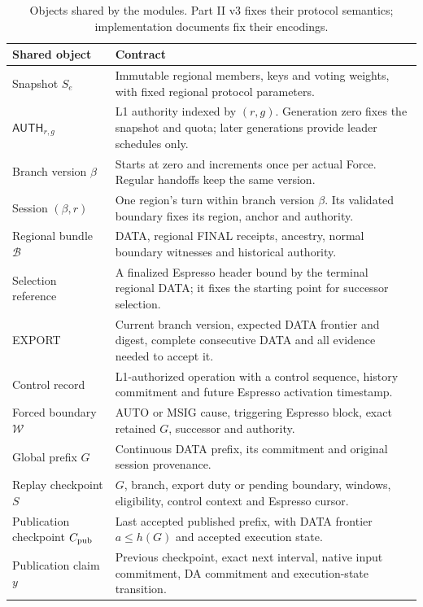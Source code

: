 \documentclass[11pt,a4paper]{article}
\newcommand{\api}[1]{\ensuremath{\mathsf{#1}}}
\begin{document}
\begin{table}[H]\centering\small
\begin{tabularx}{\linewidth}{@{}p{.26\linewidth}Y@{}}
\toprule Shared object & Contract\\\midrule
Snapshot $S_e$ & Immutable regional members, keys and voting weights,
with fixed regional protocol parameters.\\
$\api{AUTH}_{r,g}$ & L1 authority indexed by $(r,g)$.
Generation zero fixes the snapshot and quota; later generations provide
leader schedules only.\\
Branch version $\beta$ & Starts at zero and increments once per actual
Force. Regular handoffs keep the same version.\\
Session $(\beta,r)$ & One region's turn within branch version $\beta$.
Its validated boundary fixes its region, anchor and authority.\\
Regional bundle $\mathcal B$ & DATA, regional FINAL receipts, ancestry,
normal boundary witnesses and historical authority.\\
Selection reference & A finalized Espresso header bound by the terminal
regional DATA; it fixes the starting point for successor selection.\\
EXPORT & Current branch version, expected DATA frontier and digest, complete
consecutive DATA and all evidence needed to accept it.\\
Control record & L1-authorized operation with a control sequence,
history commitment and future Espresso activation timestamp.\\
Forced boundary $\mathcal W$ & AUTO or MSIG cause, triggering Espresso
block, exact retained $G$, successor and authority.\\
Global prefix $G$ & Continuous DATA prefix, its commitment and original
session provenance.\\
Replay checkpoint $S$ & $G$, branch, export duty or pending boundary,
windows, eligibility, control context and Espresso cursor.\\
Publication checkpoint $C_{\rm pub}$ & Last accepted published prefix,
with DATA frontier $a\le h(G)$ and accepted execution state.\\
Publication claim $y$ & Previous checkpoint, exact next interval, native
input commitment, DA commitment and execution-state transition.\\\bottomrule
\end{tabularx}
\caption{Objects shared by the modules. Part II v3 fixes their protocol
semantics; implementation documents fix their encodings.}
\end{table}
\end{document}
